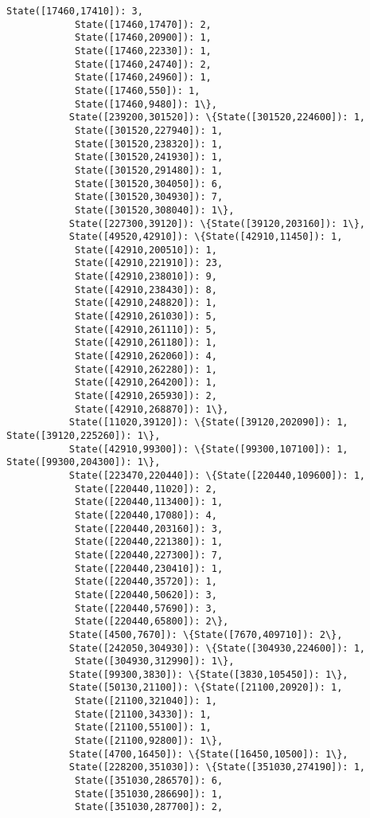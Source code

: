 \documentclass[11pt]{article}
\begin{document}
\begin{Verbatim}[commandchars=\\\{\}]
            State([17460,17410]): 3,
            State([17460,17470]): 2,
            State([17460,20900]): 1,
            State([17460,22330]): 1,
            State([17460,24740]): 2,
            State([17460,24960]): 1,
            State([17460,550]): 1,
            State([17460,9480]): 1\},
           State([239200,301520]): \{State([301520,224600]): 1,
            State([301520,227940]): 1,
            State([301520,238320]): 1,
            State([301520,241930]): 1,
            State([301520,291480]): 1,
            State([301520,304050]): 6,
            State([301520,304930]): 7,
            State([301520,308040]): 1\},
           State([227300,39120]): \{State([39120,203160]): 1\},
           State([49520,42910]): \{State([42910,11450]): 1,
            State([42910,200510]): 1,
            State([42910,221910]): 23,
            State([42910,238010]): 9,
            State([42910,238430]): 8,
            State([42910,248820]): 1,
            State([42910,261030]): 5,
            State([42910,261110]): 5,
            State([42910,261180]): 1,
            State([42910,262060]): 4,
            State([42910,262280]): 1,
            State([42910,264200]): 1,
            State([42910,265930]): 2,
            State([42910,268870]): 1\},
           State([11020,39120]): \{State([39120,202090]): 1, State([39120,225260]): 1\},
           State([42910,99300]): \{State([99300,107100]): 1, State([99300,204300]): 1\},
           State([223470,220440]): \{State([220440,109600]): 1,
            State([220440,11020]): 2,
            State([220440,113400]): 1,
            State([220440,17080]): 4,
            State([220440,203160]): 3,
            State([220440,221380]): 1,
            State([220440,227300]): 7,
            State([220440,230410]): 1,
            State([220440,35720]): 1,
            State([220440,50620]): 3,
            State([220440,57690]): 3,
            State([220440,65800]): 2\},
           State([4500,7670]): \{State([7670,409710]): 2\},
           State([242050,304930]): \{State([304930,224600]): 1,
            State([304930,312990]): 1\},
           State([99300,3830]): \{State([3830,105450]): 1\},
           State([50130,21100]): \{State([21100,20920]): 1,
            State([21100,321040]): 1,
            State([21100,34330]): 1,
            State([21100,55100]): 1,
            State([21100,92800]): 1\},
           State([4700,16450]): \{State([16450,10500]): 1\},
           State([228200,351030]): \{State([351030,274190]): 1,
            State([351030,286570]): 6,
            State([351030,286690]): 1,
            State([351030,287700]): 2,

\end{Verbatim}
\end{document}
